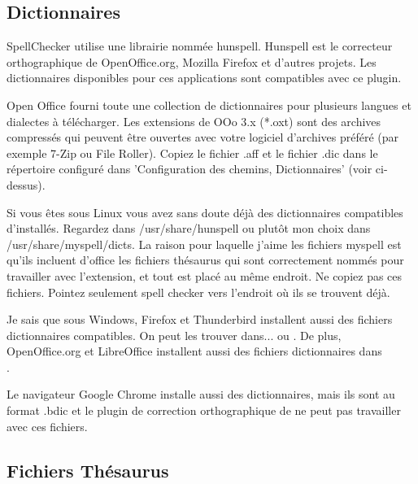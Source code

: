 
\subsection{Dictionnaires}

SpellChecker utilise une librairie nommée hunspell. Hunspell est le correcteur orthographique de OpenOffice.org, Mozilla Firefox et d'autres projets. Les dictionnaires disponibles pour ces applications sont compatibles avec ce plugin.

Open Office fourni toute une collection de dictionnaires pour plusieurs langues et dialectes à télécharger. Les extensions de OOo 3.x (*.oxt) sont des archives compressés qui peuvent être ouvertes avec votre logiciel d'archives préféré (par exemple 7-Zip ou File Roller). Copiez le fichier .aff et le fichier .dic dans le répertoire configuré dans 'Configuration des chemins, Dictionnaires' (voir ci-dessus).

Si vous êtes sous Linux vous avez sans doute déjà des dictionnaires compatibles d'installés. Regardez dans /usr/share/hunspell ou plutôt mon choix dans /usr/share/myspell/dicts. La raison pour laquelle j'aime les fichiers myspell est qu'ils incluent d'office les fichiers thésaurus qui sont correctement nommés pour travailler avec l'extension, et tout est placé au même endroit. Ne copiez pas ces fichiers. Pointez seulement spell checker vers l'endroit où ils se trouvent déjà.

Je sais que sous Windows, Firefox et Thunderbird installent aussi des fichiers dictionnaires compatibles. On peut les trouver dans...  ou . De plus, OpenOffice.org et LibreOffice installent aussi des fichiers dictionnaires dans\\ .

Le navigateur Google Chrome installe aussi des dictionnaires, mais ils sont au format .bdic et le plugin de correction orthographique de \codeblocks ne peut pas travailler avec ces fichiers.

\subsection{Fichiers Thésaurus}

